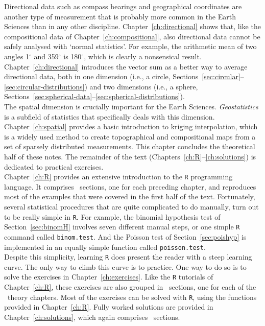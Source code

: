 Directional data such as compass bearings and geographical coordinates
are another type of measurement that is probably more common in the
Earth Sciences than in any other
discipline. Chapter~\ref{ch:directional} shows that, like the
compositional data of Chapter~\ref{ch:compositional}, also directional
data cannot be safely analysed with `normal statistics'. For example,
the arithmetic mean of two angles 1$^\circ$ and 359$^\circ$ is
180$^\circ$, which is clearly a nonsensical result.
Chapter~\ref{ch:directional} introduces the vector sum as a better way
to average directional data, both in one dimension (i.e., a circle,
Sections~\ref{sec:circular}--\ref{sec:circular-distributions}) and two
dimensions (i.e., a sphere,
Sections~\ref{sec:spherical-data}--\ref{sec:spherical-distributions}).\\

The spatial dimension is crucially important for the Earth
Sciences. \emph{Geostatistics} is a subfield of statistics that
specifically deals with this dimension. Chapter~\ref{ch:spatial}
provides a basic introduction to kriging interpolation, which is a
widely used method to create topographical and compositional maps from
a set of sparsely distributed measurements. This chapter concludes the
theoretical half of these notes. The remainder of the text
(Chapters~\ref{ch:R}--\ref{ch:solutions}) is dedicated to practical
exercises.\\

Chapter~\ref{ch:R} provides an extensive introduction to the
\texttt{R} programming language. It comprises \nch~sections, one for
each preceding chapter, and reproduces most of the examples that were
covered in the first half of the text. Fortunately, several
statistical procedures that are quite complicated to do manually, turn
out to be really simple in \texttt{R}. For example, the binomial
hypothesis test of Section~\ref{sec:binomH} involves seven different
manual steps, or one simple \texttt{R} command called
\texttt{binom.test}. And the Poisson test of Section~\ref{sec:poishyp}
is implemented in an equally simple function called
\texttt{poisson.test}.\\

Despite this simplicity, learning \texttt{R} does present the reader
with a steep learning curve. The only way to climb this curve is to
practice. One way to do so is to solve the exercises in
Chapter~\ref{ch:exercises}. Like the \texttt{R} tutorials of
Chapter~\ref{ch:R}, these exercises are also grouped in \nch~sections,
one for each of the \nch~theory chapters. Most of the exercises can be
solved with \texttt{R}, using the functions provided in
Chapter~\ref{ch:R}. Fully worked solutions are provided in
Chapter~\ref{ch:solutions}, which again comprises \nch~sections.\\

